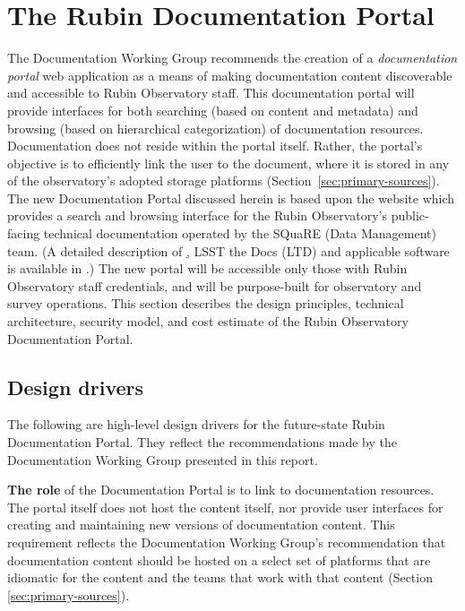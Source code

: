\section{The Rubin Documentation Portal}
\label{sec:DocPortal}

The Documentation Working Group recommends the creation of a \emph{documentation portal} web application as a means of making documentation content discoverable and accessible to Rubin Observatory staff.
This documentation portal will provide interfaces for both searching (based on content and metadata) and browsing (based on hierarchical categorization) of documentation resources.
Documentation does not reside within the portal itself.
Rather, the portal's objective is to efficiently link the user to the document, where it is stored in any of the observatory's adopted storage platforms (Section~\ref{sec:primary-sources}).
The new Documentation Portal discussed herein is based upon the website \href{www.lsst.io} \citep{lsst.io-cite} which provides a search and browsing interface for the Rubin Observatory's public-facing technical documentation operated by the SQuaRE (Data Management) team.
(A detailed description of \href{www.lsst.io}, LSST the Docs (LTD) and applicable software is available in .)
The new portal will be accessible only those with Rubin Observatory staff credentials, and will be purpose-built for observatory and survey operations.
This section describes the design principles, technical architecture, security model, and cost estimate of the Rubin Observatory Documentation Portal.

\subsection{Design drivers}

The following are high-level design drivers for the future-state Rubin Documentation Portal. 
They reflect the recommendations made by the Documentation Working Group presented in this report.

\textbf{The role}  of the Documentation Portal is to link to documentation resources.
  The portal itself does not host the content itself, nor provide user interfaces for creating and maintaining new versions of documentation content.
  This requirement reflects the Documentation Working Group's recommendation that documentation content should be hosted on a select set of platforms that are idiomatic for the content and the teams that work with that content (Section \ref{sec:primary-sources}).

